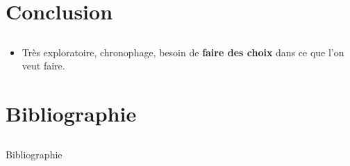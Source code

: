 \documentclass[compress,xcolor=table]{beamer}
\begin{document}
\section{Conclusion} \subsection{}

\begin{frame}{}

    \begin{block}{}
        \begin{itemize}
            \item Très exploratoire, chronophage, besoin de \textbf{faire des choix} dans ce que l'on veut faire.
        \end{itemize}
    \end{block}

\end{frame}

\section{Bibliographie} \subsection{}

\begin{frame}[allowframebreaks]{Bibliographie}

    \printbibliography[heading=none]

\end{frame}
\end{document}
